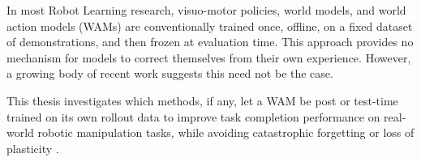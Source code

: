 In most Robot Learning research, visuo-motor policies, world models, and world action models (WAMs) are conventionally trained once, offline, on a fixed dataset of
demonstrations, and then frozen at evaluation time. This approach provides no mechanism for models to correct
themselves from their own experience. However, a growing body of recent work 
\citep{wang2026adajepa, jiang2026robottt, ye2026world} suggests this need
not be the case.

This thesis investigates which methods, if any,
let a WAM be post or test-time trained on its own rollout data to improve task completion
performance on real-world robotic manipulation tasks, while avoiding catastrophic forgetting or loss of
plasticity \citep{elsayed2023utilitybased}.
